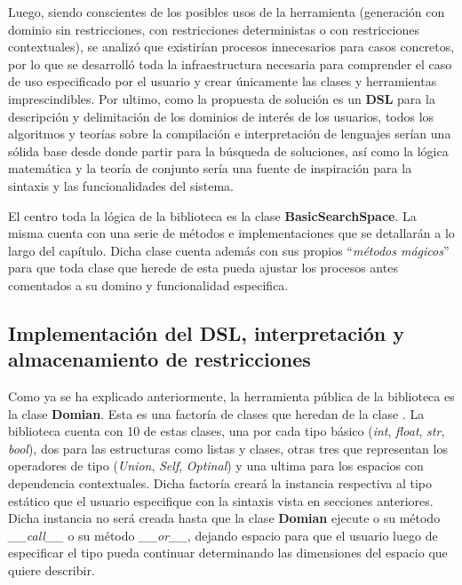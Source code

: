 Luego, siendo conscientes de los posibles usos de la herramienta (generación con dominio sin restricciones, con
restricciones deterministas o con restricciones contextuales), se analizó que existirían procesos innecesarios
para casos concretos, por lo que se desarrolló toda la infraestructura necesaria para comprender el caso de uso
especificado por el usuario y crear únicamente las clases y herramientas imprescindibles. Por ultimo, como la
propuesta de solución es un {\bf DSL} para la descripción y delimitación de los dominios de interés de los usuarios,
todos los algoritmos y teorías sobre la compilación e interpretación de lenguajes serían una sólida base desde
donde partir para la búsqueda de soluciones, así como la lógica matemática y la teoría de conjunto sería una
fuente de inspiración para la sintaxis y las funcionalidades del sistema.

El centro toda la lógica de la biblioteca es la clase {\bf BasicSearchSpace}. La misma cuenta con una
serie de métodos e implementaciones que se detallarán a lo largo del capítulo. Dicha clase cuenta además con
sus propios ``{\it métodos mágicos}'' para que toda clase que herede de esta pueda ajustar los procesos antes comentados
a su domino y funcionalidad especifica.


\subsection{Implementación del DSL, interpretación y almacenamiento de restricciones}

Como ya se ha explicado anteriormente, la herramienta pública de la biblioteca es la clase {\bf Domian}. Esta es una
factoría de clases que heredan de la clase . La biblioteca cuenta con 10 de estas clases, una
por cada tipo básico ({\it int}, {\it float}, {\it str}, {\it bool}), dos para las estructuras como listas y clases,
otras tres que representan los operadores de tipo ({\it Union}, {\it Self}, {\it Optinal}) y una ultima para los
espacios con dependencia contextuales. Dicha factoría creará la instancia respectiva al tipo estático que el usuario
especifique con la sintaxis vista en secciones anteriores. Dicha instancia no será creada hasta que la clase
    {\bf Domian} ejecute o su método {\it \_\_call\_\_} o su método {\it \_\_or\_\_}, dejando espacio para que el usuario
luego de especificar el tipo pueda continuar determinando las dimensiones del espacio que quiere describir.

